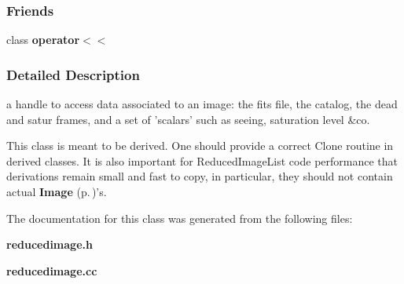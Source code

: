 \subsubsection*{Friends}
\begin{CompactItemize}
\item 
class {\bf operator$<$$<$}
\end{CompactItemize}


\subsubsection{Detailed Description}
a handle to access data associated to an image: the fits file, the catalog, the dead and satur frames, and a set of 'scalars' such as seeing, saturation level \&co.



 This class is meant to be derived. One should provide a correct Clone routine in  derived classes. It is also important for Reduced\-Image\-List code  performance that derivations remain small and fast to copy, in particular,  they should not contain actual {\bf Image} {\rm (p.\,\pageref{class_image})}'s. 



The documentation for this class was generated from the following files:\begin{CompactItemize}
\item 
{\bf reducedimage.h}\item 
{\bf reducedimage.cc}\end{CompactItemize}
